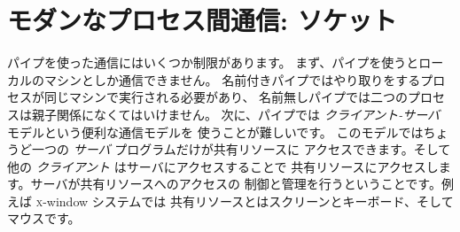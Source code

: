 %
%

\chapter{\label{sec/sockets}モダンなプロセス間通信: ソケット}

パイプを使った通信にはいくつか制限があります。
まず、パイプを使うとローカルのマシンとしか通信できません。
名前付きパイプではやり取りをするプロセスが同じマシンで実行される必要があり、
名前無しパイプでは二つのプロセスは親子関係になくてはいけません。
次に、パイプでは \emph{クライアント-サーバ} モデルという便利な通信モデルを
使うことが難しいです。
このモデルではちょうど一つの \emph{サーバ} プログラムだけが共有リソースに
アクセスできます。そして他の \emph{クライアント} はサーバにアクセスすることで
共有リソースにアクセスします。サーバが共有リソースへのアクセスの
制御と管理を行うということです。例えば \textsc{x}-window システムでは
共有リソースとはスクリーンとキーボード、そしてマウスです。

